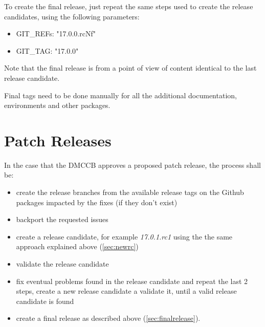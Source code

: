 To create the final release, just repeat the same steps used to create the release candidates, using the following parameters:

\begin{itemize}
\item GIT\_REFs: "17.0.0.rcNf"
\item GIT\_TAG: "17.0.0"
\end{itemize}

Note that the final release is from a point of view of content identical to the last release candidate.

Final tags need to be done manually for all the additional documentation, environments and other packages.

\newpage

\section{Patch Releases} \label{sec:patchreleases}

In the case that the DMCCB approves a proposed patch release, the process shall be:

\begin{itemize}
\item create the release branches from the available release tags on the Github packages impacted by the fixes (if they don't exist)
\item backport the requested issues
\item create a release candidate, for example \textit{17.0.1.rc1} using the the same approach explained above (\ref{sec:newrc})
\item validate the release candidate
\item fix eventual problems found in the release candidate and repeat the last 2 steps, create a new release candidate a validate it, until a valid release candidate is found
\item create a final release as described above (\ref{sec:finalrelease}).
\end{itemize}


